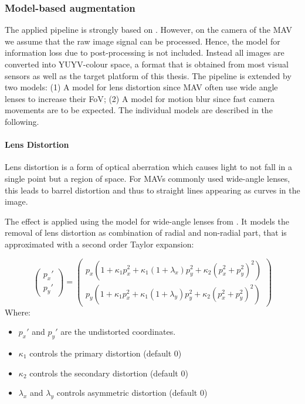 \subsubsection{Model-based augmentation}

The applied pipeline is strongly based on \cite{Carlson2018}. However, on the camera of the \ac{MAV} we assume that the raw image signal can be processed. Hence, the model for information loss due to post-processing is not included. Instead all images are converted into YUYV-colour space, a format that is obtained from most visual sensors as well as the target platform of this thesis. The pipeline is extended by two models: (1) A model for lens distortion since \ac{MAV} often use wide angle lenses to increase their \ac{FoV}; (2) A model for motion blur since fast camera movements are to be expected. The individual models are described in the following.

\paragraph{Lens Distortion}

Lens distortion is a form of optical aberration which causes light to not fall in a single point but a region of space. For \acp{MAV} commonly used wide-angle lenses, this leads to barrel distortion and thus to straight lines appearing as curves in the image.

The effect is applied using the model for wide-angle lenses from \cite{Vass}. It models the removal of lens distortion as combination of radial and non-radial part, that is approximated with a second order Taylor expansion:

\begin{equation}
\begin{pmatrix}
	p_x' \\
	p_y'
\end{pmatrix} = \begin{pmatrix}
p_x(1 + \kappa_1 p_x^2 + \kappa_1 (1 + \lambda _x)p_y^2 + \kappa_2(p_x^2 + p_y^2)^2) \\
p_y(1 + \kappa_1 p_x^2 + \kappa_1 (1 + \lambda _y)p_y^2 + \kappa_2(p_x^2 + p_y^2)^2)
\end{pmatrix} 
\label{eq:distortion}
\end{equation}
Where:
\begin{itemize}
	\item $p_x'$ and $p_y'$ are the undistorted coordinates.
	\item $\kappa_1$ controls the primary distortion (default 0)
	\item $\kappa_2$ controls the secondary distortion (default 0)
	\item $\lambda_x$ and $\lambda_y$ controls asymmetric distortion (default 0)
\end{itemize}
 
